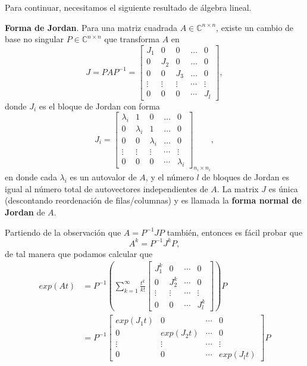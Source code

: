 Para continuar, necesitamos el siguiente resultado de álgebra lineal.
\begin{theorem}
\textbf{Forma de Jordan}. Para una matriz cuadrada $A\in\mathbb{C}^{n \times n}$, existe un cambio de base no singular $P\in\mathbb{C}^{n \times n}$ que transforma $A$ en
\begin{equation}
	J = PAP^{-1} = \begin{bmatrix}
		J_1 & 0 & 0 & \dots & 0 \\
		0 & J_2 & 0 & \dots & 0 \\
		0 & 0 & J_3 & \dots & 0 \\
		\vdots & \vdots & \vdots & \cdots & \vdots \\
		0 & 0 & 0 & \cdots & J_l
	\end{bmatrix},
\end{equation}
donde $J_i$ es el bloque de Jordan con forma
	\begin{equation}
	J_i = \begin{bmatrix}
\lambda_i & 1 & 0 & \dots & 0 \\
		0 & \lambda_i & 1 & \dots & 0 \\
		0 & 0 & \lambda_i & \dots & 0 \\
		\vdots & \vdots & \vdots & \cdots & \vdots \\
		0 & 0 & 0 & \cdots & \lambda_i
	\end{bmatrix}_{n_i\times n_i},
	\end{equation}
	en donde cada $\lambda_i$ es un autovalor de $A$, y el número $l$ de bloques de Jordan es igual al número total de autovectores independientes de $A$. La matrix $J$ es única (descontando reordenación de filas/columnas) y es llamada la \textbf{forma normal de Jordan} de $A$.
\end{theorem}

Partiendo de la observación que $A = P^{-1}JP$ también, entonces es fácil probar que 
\begin{equation}
	A^k = P^{-1} J^k P,
\end{equation}
de tal manera que podamos calcular que
\begin{align}
	exp(At) &= P^{-1}\left(\sum_{k=1}^\infty \frac{t^k}{k!} \begin{bmatrix}J_1^k & 0 & \cdots & 0 \\ 0 & J_2^k & \cdots & 0 \\ \vdots & \vdots & \cdots & \vdots \\ 0 & 0 & \cdots & J_l^k \end{bmatrix} \right) P \nonumber \\
		&= P^{-1} \begin{bmatrix}exp(J_1t) & 0 & \cdots & 0 \\ 0 & exp(J_2t) & \cdots & 0 \\ \vdots & \vdots & \cdots & \vdots \\ 0 & 0 & \cdots & exp(J_lt) \end{bmatrix} P
\end{align}

